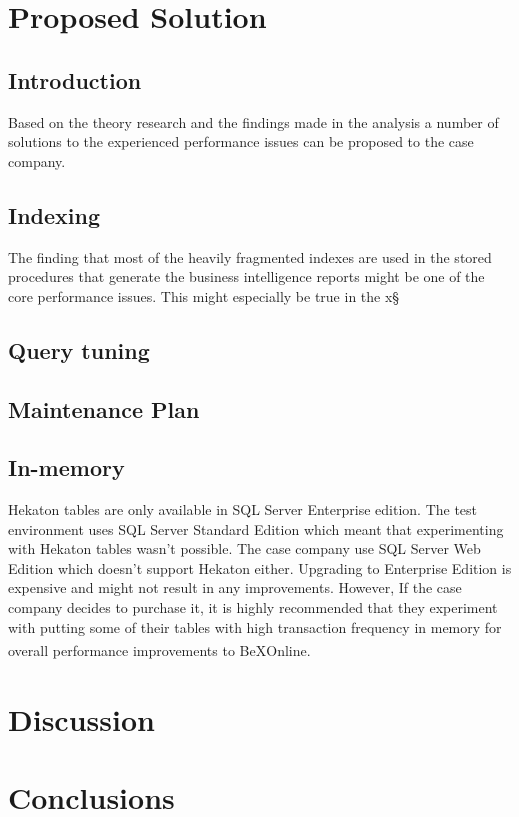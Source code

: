 \documentclass{cslthse-msc}
\newcommand{\bex}{BeX\textsuperscript{\textregistered}}
\begin{document}
\chapter{Proposed Solution}\label{sec:proposedsoluton}
\section{Introduction}
Based on the theory research and the findings made in the analysis a number of solutions to the experienced performance issues can be proposed to the case company.
\section{Indexing}
The finding that most of the heavily fragmented indexes are used in the stored procedures that generate the business intelligence reports might be one of the core performance issues. This might especially be true in the x§
\section{Query tuning}
\section{Maintenance Plan}
\section{In-memory}
Hekaton tables are only available in SQL Server Enterprise edition. The test environment uses SQL Server Standard Edition which meant that experimenting with Hekaton tables wasn't possible. The case company use SQL Server Web Edition which doesn't support Hekaton either. Upgrading to Enterprise Edition is expensive and might not result in any improvements. However, If the case company decides to purchase it, it is highly recommended that they experiment with putting some of their tables with high transaction frequency in memory for overall performance improvements to \bex Online.

\chapter{Discussion}\label{sec:discussion}

\chapter{Conclusions}\label{sec:conclusions}

\end{document}
